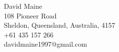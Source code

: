 \begin{center}
    \large{
        David Maine\\
        108 Pioneer Road\\ 
        Sheldon, Queensland, Australia, 4157\\
        +61 435 157 266\\
        davidmaine1997@gmail.com\\
    }
\end{center}




